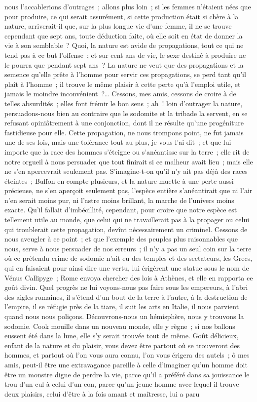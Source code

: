 \documentclass[french,twoside]{book} %
\begin{document}
nous l’accablerions d’outrages ; allons plus loin ; si les femmes n’étaient nées que pour produire, ce qui serait assurément, si cette production était si chère à la nature, arriverait-il que, sur la plus longue vie d’une femme, il ne se trouve cependant que sept ans, toute déduction faite, où elle soit en état de donner la vie à son semblable ? Quoi, la nature est avide de propagations, tout ce qui ne tend pas à ce but l’offense ; et sur cent ans de vie, le sexe destiné à produire ne le pourra que pendant sept ans ? La nature ne veut que des propagations et la semence qu’elle prête à l’homme pour servir ces propagations, se perd tant qu’il plaît à l’homme ; il trouve le même plaisir à cette perte qu’à l’emploi utile, et jamais le moindre inconvénient ?… Cessons, mes amis, cessons de croire à de telles absurdités ; elles font frémir le bon sens ; ah ! loin d’outrager la nature, persuadons-nous bien au contraire que le sodomite et la tribade la servent, en se refusant opiniâtrement à une conjonction, dont il ne résulte qu’une progéniture fastidieuse pour elle. Cette propagation, ne nous trompons point, ne fut jamais une de ses lois, mais une tolérance tout au plus, je vous l’ai dit ; et que lui importe que la race des hommes s’éteigne ou s’anéantisse sur la terre ; elle rit de notre orgueil à nous persuader que tout finirait si ce malheur avait lieu ; mais elle ne s’en apercevrait seulement pas. S’imagine-t-on qu’il n’y ait pas déjà des races éteintes ; Buffon en compte plusieurs, et la nature muette à une perte aussi précieuse, ne s’en aperçoit seulement pas, l’espèce entière s’anéantirait que ni l’air n’en serait moins pur, ni l’astre moins brillant, la marche de l’univers moins exacte. Qu’il fallait d’imbécillité, cependant, pour croire que notre espèce est tellement utile au monde, que celui qui ne travaillerait pas à la propager ou celui qui troublerait cette propagation, devînt nécessairement un criminel. Cessons de nous aveugler à ce point ; et que l’exemple des peuples plus raisonnables que nous, serve à nous persuader de nos erreurs ; il n’y a pas un seul coin sur la terre où ce prétendu crime de sodomie n’ait eu des temples et des sectateurs, les Grecs, qui en faisaient pour ainsi dire une vertu, lui érigèrent une statue sous le nom de Vénus Callipyge ; Rome envoya chercher des lois à Athènes, et elle en rapporta ce goût divin. Quel progrès ne lui voyons-nous pas faire sous les empereurs, à l’abri des aigles romaines, il s’étend d’un bout de la terre à l’autre, à la destruction de l’empire, il se réfugie près de la tiare, il suit les arts en Italie, il nous parvient quand nous nous poliçons. Découvrons-nous un hémisphère, nous y trouvons la sodomie. Cook mouille dans un nouveau monde, elle y règne ; si nos ballons eussent été dans la lune, elle s’y serait trouvée tout de même. Goût délicieux, enfant de la nature et du plaisir, vous devez être partout où se trouveront des hommes, et partout où l’on vous aura connu, l’on vous érigera des autels ; ô mes amis, peut-il être une extravagance pareille à celle d’imaginer qu’un homme doit être un monstre digne de perdre la vie, parce qu’il a préféré dans sa jouissance le trou d’un cul à celui d’un con, parce qu’un jeune homme avec lequel il trouve deux plaisirs, celui d’être à la fois amant et maîtresse, lui a paru 
\end{document}
